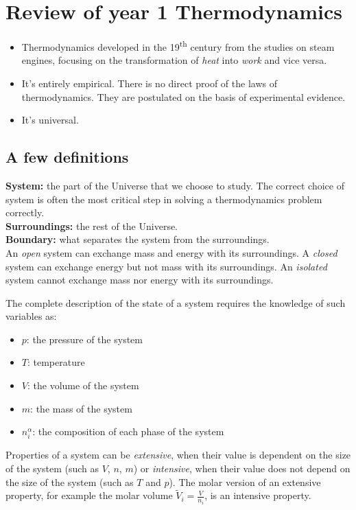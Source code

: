 \documentclass[12pt,a4paper]{report}
\begin{document}
   \pagestyle{headings}
   \thispagestyle{plain}
   \newpage
   \noindent
   \begin{center}
   \end{center}
   \section*{Review of year 1 Thermodynamics}
   \begin{itemize}
   \item Thermodynamics developed in the 19\textsuperscript{th} century from the studies on steam engines, focusing on the transformation of \textit{heat} into \textit{work} and vice versa.
   \item It's entirely empirical. There is no direct proof of the laws of thermodynamics. They are postulated on the basis of experimental evidence.
   \item It's universal.
   \end{itemize}
   \subsection*{A few definitions}
   \textbf{System:} the part of the Universe that we choose to study. The correct choice of system is often the most critical step in solving a thermodynamics problem correctly.\\ \textbf{Surroundings:} the rest of the Universe.\\ \textbf{Boundary:} what separates the system from the surroundings.\\ An \textit{open} system can exchange mass and energy with its surroundings. A \textit{closed} system can exchange energy but not mass with its surroundings. An \textit{isolated} system cannot exchange mass nor energy with its surroundings. 
   
   The complete description of the state of a system requires the knowledge of such variables as:
   \begin{itemize}
   \item $p$: the pressure of the system
   \item $T$: temperature
   \item $V$: the volume of the system
   \item $m$: the mass of the system
   \item $n^{\alpha}_{i}$: the composition of each phase of the system
   \end{itemize}
   Properties of a system can be \textit{extensive}, when their value is dependent on the size of the system (such as $V$, $n$, $m$) or \textit{intensive}, when their value does not depend on the size of the system (such as $T$ and $p$). The molar version of an extensive property, for example the molar volume $\widetilde{V}_{i} = \frac{V}{n_{i}}$, is an intensive property.
   
\end{document}
